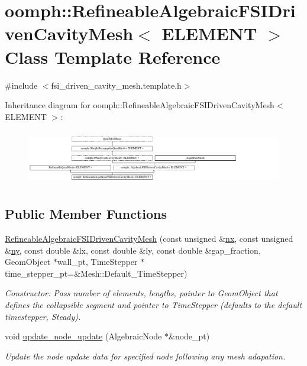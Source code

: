 \hypertarget{classoomph_1_1RefineableAlgebraicFSIDrivenCavityMesh}{}\section{oomph\+:\+:Refineable\+Algebraic\+F\+S\+I\+Driven\+Cavity\+Mesh$<$ E\+L\+E\+M\+E\+NT $>$ Class Template Reference}
\label{classoomph_1_1RefineableAlgebraicFSIDrivenCavityMesh}


{\ttfamily \#include $<$fsi\+\_\+driven\+\_\+cavity\+\_\+mesh.\+template.\+h$>$}

Inheritance diagram for oomph\+:\+:Refineable\+Algebraic\+F\+S\+I\+Driven\+Cavity\+Mesh$<$ E\+L\+E\+M\+E\+NT $>$\+:\begin{figure}[H]
\begin{center}
\leavevmode
\includegraphics[height=2.430556cm]{classoomph_1_1RefineableAlgebraicFSIDrivenCavityMesh}
\end{center}
\end{figure}
\subsection*{Public Member Functions}
\begin{DoxyCompactItemize}
\item 
\hyperlink{classoomph_1_1RefineableAlgebraicFSIDrivenCavityMesh_a123b12382b582eb20dd2749d9f85cd8c}{Refineable\+Algebraic\+F\+S\+I\+Driven\+Cavity\+Mesh} (const unsigned \&\hyperlink{classoomph_1_1SimpleRectangularQuadMesh_a4ff7678ec433180e2245ea2147f222b7}{nx}, const unsigned \&\hyperlink{classoomph_1_1SimpleRectangularQuadMesh_a45011f22dedd480392b1f376e4269921}{ny}, const double \&lx, const double \&ly, const double \&gap\+\_\+fraction, Geom\+Object $\ast$wall\+\_\+pt, Time\+Stepper $\ast$time\+\_\+stepper\+\_\+pt=\&Mesh\+::\+Default\+\_\+\+Time\+Stepper)
\begin{DoxyCompactList}\small\item\em Constructor\+: Pass number of elements, lengths, pointer to Geom\+Object that defines the collapsible segment and pointer to Time\+Stepper (defaults to the default timestepper, Steady). \end{DoxyCompactList}\item 
void \hyperlink{classoomph_1_1RefineableAlgebraicFSIDrivenCavityMesh_aa68685323573763e1ded0cceed5ad14f}{update\+\_\+node\+\_\+update} (Algebraic\+Node $\ast$\&node\+\_\+pt)
\begin{DoxyCompactList}\small\item\em Update the node update data for specified node following any mesh adapation. \end{DoxyCompactList}\end{DoxyCompactItemize}
